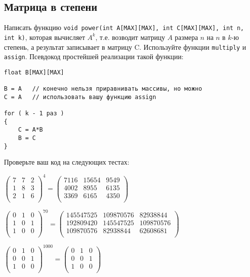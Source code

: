 \documentclass{article}
\begin{document}
\subsection{Матрица в степени}
Написать функцию \texttt{void power(int A[MAX][MAX], int C[MAX][MAX], int n, int k)}, которая вычисляет $A^k$, т.е. возводит матрицу $A$ размера $n$ на $n$ в $k$-ю степень, а результат записывает в матрицу C. Используйте функции \texttt{multiply} и \texttt{assign}. Псевдокод простейшей реализации такой функции:
\begin{lstlisting}
float B[MAX][MAX]

B = A   // конечно нельзя приравнивать массивы, но можно 
C = A   // использовать вашу функцию assign

for ( k - 1 раз )
{
	C = A*B
	B = C
}
\end{lstlisting}
Проверьте ваш код на следующих тестах:
\begin{center}

$
\begin{pmatrix}
7 & 7 & 2 \\
1 & 8 & 3 \\
2 & 1 & 6 \\
\end{pmatrix}^4 = 
\begin{pmatrix}
7116 & 15654 & 9549 \\
4002 & 8955 & 6135 \\
3369 & 6165 & 4350 \\
\end{pmatrix}
$
\end{center}



\begin{center}
$
\begin{pmatrix}
0 & 1 & 0 \\
1 & 0 & 1 \\
1 & 0 & 0 \\
\end{pmatrix}^{70} = 
\begin{pmatrix}
145547525 & 109870576 & 82938844 \\
192809420 & 145547525 & 109870576 \\
109870576 & 82938844 & 62608681 \\
\end{pmatrix}
$
\end{center}

\begin{center}
$
\begin{pmatrix}
0 & 1 & 0 \\
0 & 0 & 1 \\
1 & 0 & 0 \\
\end{pmatrix}^{1000} = 
\begin{pmatrix}
0 & 1 & 0 \\
0 & 0 & 1 \\
1 & 0 & 0 \\
\end{pmatrix}
$
\end{center}
\end{document}
